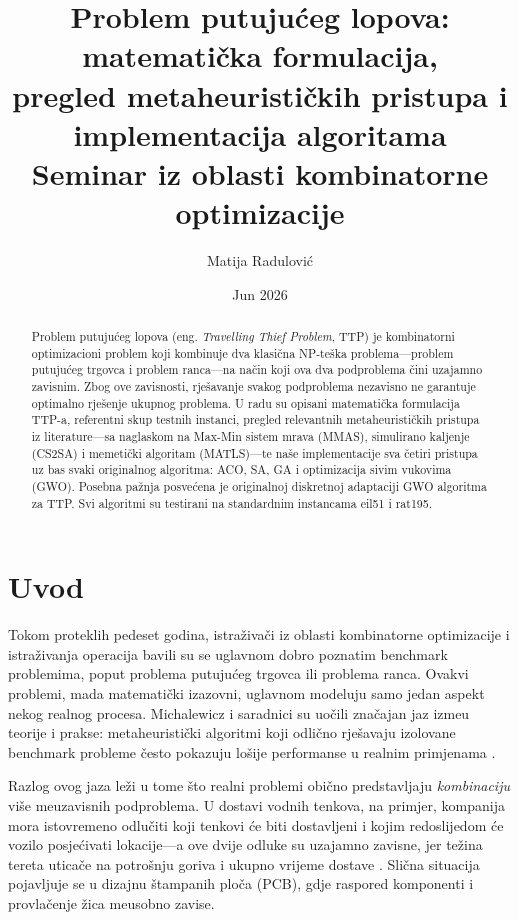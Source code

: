 \documentclass[12pt,a4paper]{article}
\title{\textbf{Problem putuju\'{c}eg lopova: matematička formulacija,\\
pregled metaheuristi\v{c}kih pristupa i implementacija algoritama}\\[0.5em]
\large Seminar iz oblasti kombinatorne optimizacije}
\author{Matija Radulovi\'{c}}
\date{Jun 2026}
\begin{document}
\maketitle

\begin{abstract}
Problem putuju\'{c}eg lopova (eng. \textit{Travelling Thief Problem}, TTP) je kombinatorni optimizacioni problem koji kombinuje dva klasi\v{c}na NP-te\v{s}ka problema---problem putuju\'{c}eg trgovca i problem ranca---na na\v{c}in koji ova dva podproblema \v{c}ini uzajamno zavisnim. Zbog ove zavisnosti, rje\v{s}avanje svakog podproblema nezavisno ne garantuje optimalno rje\v{s}enje ukupnog problema. U radu su opisani matematička formulacija TTP-a, referentni skup testnih instanci, pregled relevantnih metaheuristi\v{c}kih pristupa iz literature---sa naglaskom na Max-Min sistem mrava (MMAS), simulirano kaljenje (CS2SA) i memetički algoritam (MATLS)---te naše implementacije sva \v{c}etiri pristupa uz bas svaki originalnog algoritma: ACO, SA, GA i optimizacija sivim vukovima (GWO). Posebna pa\v{z}nja posve\'{c}ena je originalnoj diskretnoj adaptaciji GWO algoritma za TTP. Svi algoritmi su testirani na standardnim instancama eil51 i rat195.
\end{abstract}

\newpage
\tableofcontents
\newpage

\section{Uvod}

Tokom proteklih pedeset godina, istra\v{z}iva\v{c}i iz oblasti kombinatorne optimizacije i istra\v{z}ivanja operacija bavili su se uglavnom dobro poznatim benchmark problemima, poput problema putuju\'{c}eg trgovca ili problema ranca. Ovakvi problemi, mada matemati\v{c}ki izazovni, uglavnom modeluju samo jedan aspekt nekog realnog procesa. Michalewicz i saradnici su uo\v{c}ili zna\v{c}ajan jaz izme\dj{}u teorije i prakse: metaheuristi\v{c}ki algoritmi koji odli\v{c}no rje\v{s}avaju izolovane benchmark probleme \v{c}esto pokazuju lo\v{s}ije performanse u realnim primjenama \cite{bonyadi2013}.

Razlog ovog jaza le\v{z}i u tome \v{s}to realni problemi obi\v{c}no predstavljaju \textit{kombinaciju} vi\v{s}e me\dj{}uzavisnih podproblema. U dostavi vo\-dnih tenkova, na primjer, kompanija mora istovremeno odlu\v{c}iti koji tenkovi \'{c}e biti dostavljeni i kojim redoslijedom \'{c}e vozilo posje\'{c}ivati lokacije---a ove dvije odluke su uzajamno zavisne, jer te\v{z}ina tereta utica\v{c}e na potro\v{s}nju goriva i ukupno vrijeme dostave \cite{bonyadi2013}. Sli\v{c}na situacija pojavljuje se u dizajnu \v{s}tampanih ploča (PCB), gdje raspored komponenti i provlačenje žica me\dj{}usobno zavise.
\end{document}
